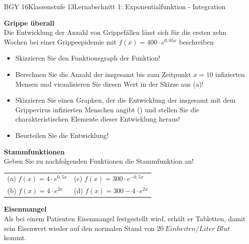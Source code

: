 \documentclass[oneside,openany,headings=optiontotoc,11pt,numbers=noenddot]{scrreprt}
\begin{document}
	\begin{worksheet}{BGY 16}{Klassenstufe 13}{Lernabschnitt 1: Exponentialfunktion - Integration}
				
		\noindent
		\sffamily
		\begin{framed}
			\noindent
			\large{\textbf{Grippe überall}}\\
			\normalsize
			Die Entwicklung der Anzahl von Grippefällen lässt sich für die ersten zehn Wochen bei einer Grippeepidemie mit \(f(x) = 400\cdot{}e^{0,05x}\) beschreiben
			\tiny{\color{codegray}{x: Wochen nach dem Ausbruch; \(f(x)\): Neuerkrankte in Tausend}}\normalsize\normalcolor
			\begin{itemize}
				\item[(a)] Skizzieren Sie den Funktionsgraph der Funktion!\\
				\small{\color{codegray}{Koordinatensystem auf der Rückseite!}}
				\item[(b)] Berechnen Sie die Anzahl der insgesamt bis zum Zeitpunkt \(x=10\) infizierten Mensen und visualisieren Sie diesen Wert in der Skizze aus (a)!
				\item[(c)] Skizzieren Sie einen Graphen, der die Entwicklung der insgesamt mit dem Grippevirus infizierten Menschen angibt (\small{}) \normalcolor\normalsize und stellen Sie die charakteristischen Elemente dieser Entwicklung heraus!
				\item[(d)] Beurteilen Sie die Entwicklung!
			\end{itemize}
		\end{framed}
		\begin{framed}
			\noindent
			\large{\textbf{Stammfunktionen}}\\
			\normalsize
			Geben Sie zu nachfolgenden Funktionen die Stammfunktion an!\\
			\par\noindent
			\begin{tabularx}{\textwidth}{XX}
				(a) \(f(x) = 4\cdot{}e^{0,5x}\) & (c) \(f(x) = 300\cdot{}e^{-0,5x}\)\\
				(b) \(f(x) = 4\cdot{}e^{2x}\) & (d) \(f(x) = 300 - 4\cdot{}e^{2x}\)
			\end{tabularx}
		\end{framed}
		\begin{framed}
			\noindent
			\large{\textbf{Eisenmangel}}\\
			\normalsize
			Als bei einem Patienten Eisenmangel festgestellt wird, erhält er Tabletten, damit sein Eisenwert wieder auf den normalen Stand von \(20\ Einheiten/Liter\ Blut\) kommt.\\

\end{framed}
\end{worksheet}
\end{document}

